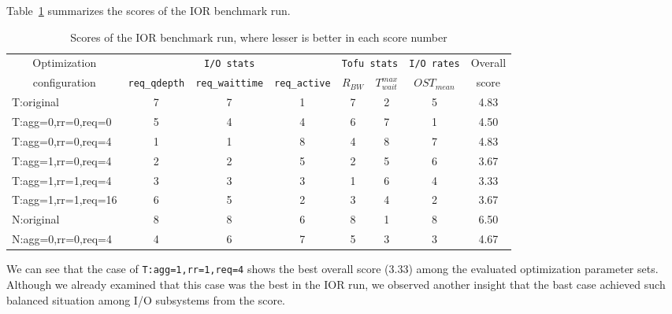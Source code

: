 \documentclass{jhps}
\begin{document}
Table~\ref{tbl:IOR_OVERALL_EVAL} summarizes the scores of the IOR benchmark run.
%
\begin{table}[tb]
\caption{Scores of the IOR benchmark run, where lesser is better in each score number}
\centering
\begin{tabular}{lccccccc}
\hline
\multicolumn{1}{c}{Optimization}  & \multicolumn{3}{c}{{\tt I/O stats}} & \multicolumn{2}{c}{{\tt Tofu stats}} & {\tt I/O rates} & Overall \\
\multicolumn{1}{c}{configuration} & {\tt req\_qdepth} & {\tt req\_waittime} & {\tt req\_active} &  $R_{BW}$ & $T_{wait}^{max}$ & $OST_{mean}$ & score \\
\hline
T:original          & 7 & 7 & 1 & 7 & 2 & 5 & 4.83 \\
T:agg=0,rr=0,req=0  & 5 & 4 & 4 & 6 & 7 & 1 & 4.50 \\
T:agg=0,rr=0,req=4  & 1 & 1 & 8 & 4 & 8 & 7 & 4.83 \\
T:agg=1,rr=0,req=4  & 2 & 2 & 5 & 2 & 5 & 6 & 3.67 \\
T:agg=1,rr=1,req=4  & 3 & 3 & 3 & 1 & 6 & 4 & 3.33 \\
T:agg=1,rr=1,req=16 & 6 & 5 & 2 & 3 & 4 & 2 & 3.67 \\
N:original          & 8 & 8 & 6 & 8 & 1 & 8 & 6.50 \\
N:agg=0,rr=0,req=4  & 4 & 6 & 7 & 5 & 3 & 3 & 4.67 \\
\hline
\end{tabular}
\label{tbl:IOR_OVERALL_EVAL}
\end{table}
%
We can see that the case of {\tt T:agg=1,rr=1,req=4} shows
the best overall score (3.33) among the evaluated optimization parameter sets.
Although we already examined that this case was the best in the IOR run,
we observed another insight that the bast case achieved such balanced situation
among I/O subsystems from the score.
\end{document}
